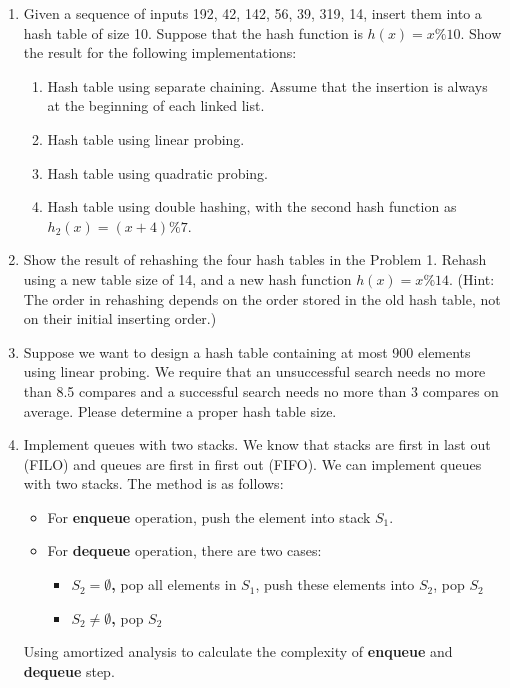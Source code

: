 \documentclass[12pt,a4paper]{article}
\theoremstyle{definition}
\begin{document}
\begin{enumerate}

\item  Given a sequence of inputs 192, 42, 142, 56, 39, 319, 14, insert them
into a hash table of size 10. Suppose that the hash function is $h(x) = x\%10$. Show the
result for the following implementations:
	\begin{enumerate}
	\item Hash table using separate chaining. Assume that the insertion is always at the
beginning of each linked list.
	\item Hash table using linear probing.
	\item Hash table using quadratic probing.
	\item Hash table using double hashing, with the second hash function as $h_2 (x) = (x+4)\%7$.
	\end{enumerate}

\item	 Show the result of rehashing the four hash tables in the Problem 1. Rehash
using a new table size of 14, and a new hash function $h(x) = x\%14$. {\color{blue}(Hint: The order
in rehashing depends on the order stored in the old hash table, not on their initial
inserting order.)}

\item  Suppose we want to design a hash table containing at most 900 elements using
linear probing. We require that an unsuccessful search needs no more than 8.5 compares
and a successful search needs no more than 3 compares on average. Please determine
a proper hash table size.

\item Implement queues with two stacks. We know that stacks are first in last out (FILO) and queues are first in first out (FIFO). We can implement queues with two stacks. The method is as follows:
	\begin{itemize}
		\item{For \textbf{enqueue} operation,} push the element into stack $S_1$.
		\item{For \textbf{dequeue} operation,} there are two cases:
		\begin{itemize}
			\item \textbf{$S_2 = \emptyset$,} pop all elements in $S_1$, push these elements into $S_2$, pop $S_2$
			\item \textbf{$S_2 \neq \emptyset$,} pop $S_2$
		\end{itemize}
	\end{itemize}
	Using amortized analysis to calculate the complexity of \textbf{enqueue} and \textbf{dequeue} step.


\end{enumerate}

\end{document}
